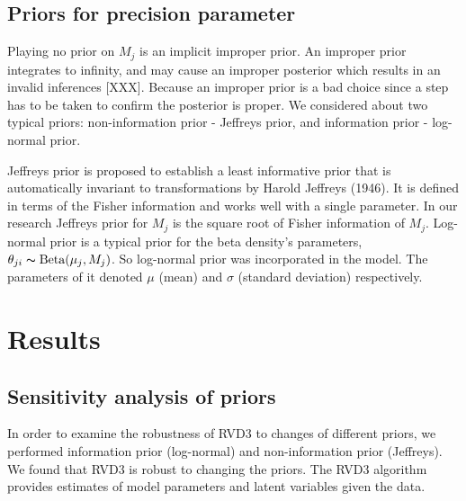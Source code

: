 \documentclass[11pt,reqno]{amsart}
\begin{document}

\subsection{Priors for precision parameter}
Playing no prior on $ M_{j}$ is an implicit improper prior. An improper prior integrates to infinity, and may cause an improper posterior which results in an invalid inferences [XXX]. Because an improper prior is a bad choice since a step has to be taken to confirm the posterior is proper. We considered about two typical priors: non-information prior - Jeffreys prior, and information prior - log-normal prior.

Jeffreys prior is proposed to establish a least informative prior that is automatically invariant to transformations by Harold Jeffreys (1946). It is defined in terms of the Fisher information and works well with a single parameter. In our research Jeffreys prior for $M_j$ is the square root of Fisher information of $M_j$. Log-normal prior is a typical prior for the beta density's parameters, $\theta_{ji} \thicksim \text{Beta}(\mu_j, M_j)$. So log-normal prior was incorporated in the model. The parameters of it denoted $\mu$ (mean) and $\sigma$ (standard deviation) respectively.

\section{Results}

\subsection{Sensitivity analysis of priors}
In order to examine the robustness of RVD3 to changes of different priors, we performed information prior (log-normal) and non-information prior (Jeffreys). We found that RVD3 is robust to changing the priors. The RVD3 algorithm provides estimates of model parameters and latent variables given the data.
\end{document}
